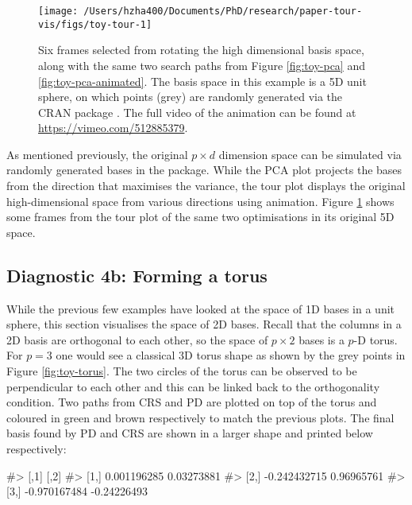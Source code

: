 \begin{Schunk}
\begin{figure}

{\centering \texttt{[image: /Users/hzha400/Documents/PhD/research/paper-tour-vis/figs/toy-tour-1]} 

}

\caption{Six frames selected from rotating the high dimensional basis space, along with the same two search paths from Figure \ref{fig:toy-pca} and \ref{fig:toy-pca-animated}. The basis space in this example is a 5D unit sphere, on which points (grey) are randomly generated via the CRAN package . The full video of the animation can be found at \url{https://vimeo.com/512885379}.}\label{fig:toy-tour}
\end{figure}
\end{Schunk}

As mentioned previously, the original \(p \times d\) dimension space can
be simulated via randomly generated bases in the 
\citep{geozoo} package. While the PCA plot projects the bases from the
direction that maximises the variance, the tour plot displays the
original high-dimensional space from various directions using animation.
Figure \ref{fig:toy-tour} shows some frames from the tour plot of the
same two optimisations in its original 5D space.

\hypertarget{diagnostic-4b-forming-a-torus}{%
\subsection{Diagnostic 4b: Forming a
torus}\label{diagnostic-4b-forming-a-torus}}

While the previous few examples have looked at the space of 1D bases in
a unit sphere, this section visualises the space of 2D bases. Recall
that the columns in a 2D basis are orthogonal to each other, so the
space of \(p \times 2\) bases is a \(p\)-D torus. For \(p = 3\) one
would see a classical 3D torus shape as shown by the grey points in
Figure \ref{fig:toy-torus}. The two circles of the torus can be observed
to be perpendicular to each other and this can be linked back to the
orthogonality condition. Two paths from CRS and PD are plotted on top of
the torus and coloured in green and brown respectively to match the
previous plots. The final basis found by PD and CRS are shown in a
larger shape and printed below respectively:

\begin{Schunk}
\begin{Soutput}
#>              [,1]        [,2]
#> [1,]  0.001196285  0.03273881
#> [2,] -0.242432715  0.96965761
#> [3,] -0.970167484 -0.24226493
\end{Soutput}
\end{Schunk}

